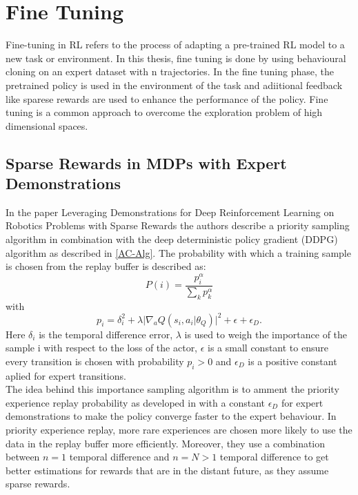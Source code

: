 \section{Fine Tuning}
Fine-tuning in RL refers to the process of adapting a pre-trained RL model to a new task or environment. In this thesis, fine tuning is done by using behavioural 
cloning on an expert dataset with n trajectories. In the fine tuning phase, the pretrained policy is used in the environment of the task and adiitional feedback 
like sparese rewards are used to enhance the performance of the policy. Fine tuning is a common approach to overcome the exploration problem of high dimensional 
spaces.
\subsection{Sparse Rewards in MDPs with Expert Demonstrations}
In the paper Leveraging Demonstrations for Deep Reinforcement Learning on Robotics Problems with Sparse Rewards \cite{LDDRLP} the authors describe a priority 
sampling algorithm in combination with the deep deterministic policy gradient (DDPG) algorithm as described in \ref{AC-Alg}. The probability with which a 
training sample is chosen from the replay buffer is described as:
\begin{equation}
    P(i) = \frac{p_i^\alpha}{\sum\limits_{k} p_k^\alpha}
\end{equation}
with 
\begin{equation}
    p_i = \delta_{i}^2 + \lambda \lvert \nabla_a Q(s_i, a_i \vert \theta_Q) \rvert^2 + \epsilon + \epsilon_{D}.
\end{equation}
Here $\delta_{i}$ is the temporal difference error, $\lambda$ is used to weigh the importance of the sample i with respect to the loss of the actor, 
$\epsilon$ is a small constant to ensure every transition is chosen with probability $p_i > 0$ and $\epsilon_D$ is a positive constant aplied for expert transitions.\\
The idea behind this importance sampling algorithm is to amment the priority experience replay probability as developed in \cite{https://arxiv.org/pdf/1511.05952.pdf} 
with a constant $\epsilon_{D}$ for expert demonstrations to make the policy converge faster to the expert behaviour. In priority experience replay, more rare 
experiences are chosen more likely to use the data in the replay buffer more efficiently. Moreover, they use a combination between $n=1$ temporal difference and 
$n=N > 1$ temporal difference to get better estimations for rewards that are in the distant future, as they assume sparse rewards.\\
